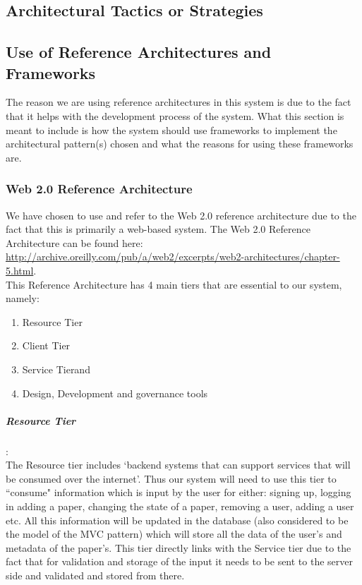 \documentclass[a4paper,12pt]{article}
\begin{document}
\subsection{Architectural Tactics or Strategies}

\subsection{Use of Reference Architectures and Frameworks}
The reason we are using reference architectures in this system is due to the fact that it helps with the development process of the system. What this section is meant to include is how the system should use frameworks to implement the architectural pattern(s) chosen and what the reasons for using these frameworks are.

\subsubsection{Web 2.0 Reference Architecture}
\noindent
We have chosen to use and refer to the Web 2.0 reference architecture due to the fact that this is primarily a web-based system. The Web 2.0 Reference Architecture can be found here: \url{http://archive.oreilly.com/pub/a/web2/excerpts/web2-architectures/chapter-5.html}.\\

\noindent
This Reference Architecture has 4 main tiers that are essential to our system, namely:
\begin{enumerate}
	\item Resource Tier
	\item Client Tier
	\item Service Tierand
	\item Design, Development and governance tools
\end{enumerate}

\subparagraph{Resource Tier}\hspace{-10pt}:\\
The Resource tier includes `backend systems that can support services that will be consumed over the internet'. Thus our system will need to use this tier to ``consume" information which is input by the user for either: signing up, logging in adding a paper, changing the state of a paper, removing a user, adding a user etc. All this information will be updated in the database (also considered to be the model of the MVC pattern) which will store all the data of the user's and metadata of the paper's. This tier directly links with the Service tier due to the fact that for validation and storage of the input it needs to be sent to the server side and validated and stored from there. 
\end{document}
